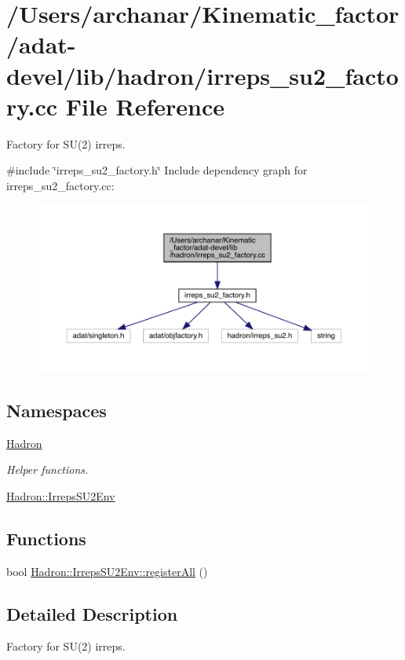 \hypertarget{adat-devel_2lib_2hadron_2irreps__su2__factory_8cc}{}\section{/\+Users/archanar/\+Kinematic\+\_\+factor/adat-\/devel/lib/hadron/irreps\+\_\+su2\+\_\+factory.cc File Reference}
\label{adat-devel_2lib_2hadron_2irreps__su2__factory_8cc}


Factory for S\+U(2) irreps.  


{\ttfamily \#include \char`\"{}irreps\+\_\+su2\+\_\+factory.\+h\char`\"{}}\newline
Include dependency graph for irreps\+\_\+su2\+\_\+factory.\+cc\+:
\nopagebreak
\begin{figure}[H]
\begin{center}
\leavevmode
\includegraphics[width=350pt]{d0/db8/adat-devel_2lib_2hadron_2irreps__su2__factory_8cc__incl}
\end{center}
\end{figure}
\subsection*{Namespaces}
\begin{DoxyCompactItemize}
\item 
 \mbox{\hyperlink{namespaceHadron}{Hadron}}
\begin{DoxyCompactList}\small\item\em Helper functions. \end{DoxyCompactList}\item 
 \mbox{\hyperlink{namespaceHadron_1_1IrrepsSU2Env}{Hadron\+::\+Irreps\+S\+U2\+Env}}
\end{DoxyCompactItemize}
\subsection*{Functions}
\begin{DoxyCompactItemize}
\item 
bool \mbox{\hyperlink{namespaceHadron_1_1IrrepsSU2Env_a431c2f7d56a7ee761b4dda2bb49cfd70}{Hadron\+::\+Irreps\+S\+U2\+Env\+::register\+All}} ()
\end{DoxyCompactItemize}


\subsection{Detailed Description}
Factory for S\+U(2) irreps. 

